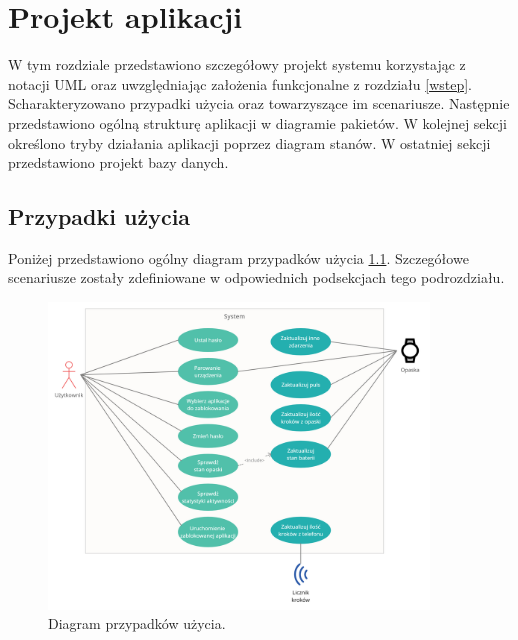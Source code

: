 \chapter{Projekt aplikacji}
\thispagestyle{chapterBeginStyle}
\label{rozdzial2}
W tym rozdziale przedstawiono szczegółowy projekt systemu korzystając z notacji UML oraz uwzględniając założenia funkcjonalne z rozdziału \ref{wstep}.
Scharakteryzowano przypadki użycia oraz towarzyszące im scenariusze. Następnie przedstawiono ogólną strukturę aplikacji w diagramie pakietów. W kolejnej sekcji określono tryby działania aplikacji poprzez diagram stanów. W ostatniej sekcji przedstawiono projekt bazy danych. 

\section{Przypadki użycia}
Poniżej przedstawiono ogólny diagram przypadków użycia \ref{use_case}. Szczegółowe scenariusze zostały zdefiniowane w odpowiednich podsekcjach tego podrozdziału.
\begin{figure}[H]
    \begin{center}
        \includegraphics[width=0.9\textwidth]{UseCaseDiagram.png}
    \end{center}
    \caption{{\color{dgray}Diagram przypadków użycia.}} \label{use_case}
\end{figure}

